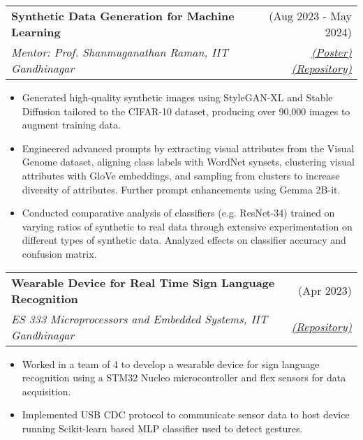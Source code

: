 \documentclass[a4paper,10pt]{report}
\makeatletter
\newcommand{\resumeSubheading}[4]{
  \vspace{-1pt}\item
    \begin{tabular*}{0.97\textwidth}[t]{l@{\extracolsep{\fill}}r}
      \textbf{#1} & #2 \\
      \textit{\small#3} & \textit{\small #4} \\
    \end{tabular*}\vspace{-6pt}
}
\makeatother
\begin{document}
    \resumeSubheading
      {Synthetic Data Generation for Machine Learning}{(Aug 2023 - May 2024)}{Mentor: Prof. Shanmuganathan Raman, IIT Gandhinagar}
      {\textcolor{lightblue}{\href{https://drive.google.com/file/d/1EdvRO9tcQluWlHwwh-OfD8RuvAoGLDWt/view?usp=sharing}{(Poster)}}\textcolor{lightblue}{\href{https://github.com/Utkarsh-Mishra444/Syn-Gen}{(Repository)}}}{}
       \begin{itemize}
        \item Generated high-quality synthetic images using StyleGAN-XL and Stable Diffusion tailored to the CIFAR-10 dataset, producing over 90,000 images to augment training data.
        \vspace{-2pt}
        \item Engineered advanced prompts by extracting visual attributes from the Visual Genome dataset, aligning class labels with WordNet synsets, clustering visual attributes with GloVe embeddings, and sampling from clusters to increase diversity of attributes. Further prompt enhancements using Gemma 2B-it.
        \vspace{-2pt}
        \item Conducted comparative analysis of classifiers (e.g. ResNet-34) trained on varying ratios of synthetic to real data through extensive experimentation on different types of synthetic data. Analyzed effects on classifier accuracy and confusion matrix. 

     \end{itemize}


\vspace{-6pt}

    \resumeSubheading
      {Wearable Device for Real Time Sign Language Recognition}{(Apr 2023)}{ES 333 Microprocessors and Embedded Systems, IIT Gandhinagar}
      {\textcolor{lightblue}{\href{https://github.com/Utkarsh-Mishra444/Sign-Recog-Glove}{(Repository)}}}{}
       \begin{itemize}
        \item Worked in a team of 4 to develop a wearable device for sign language recognition using a STM32 Nucleo microcontroller and flex sensors for data acquisition. 
        \vspace{-2pt}
        \item Implemented USB CDC protocol to communicate sensor data to host device running Scikit-learn based MLP classifier used to detect gestures.
        \vspace{-2pt}

     \end{itemize}
\end{document}

